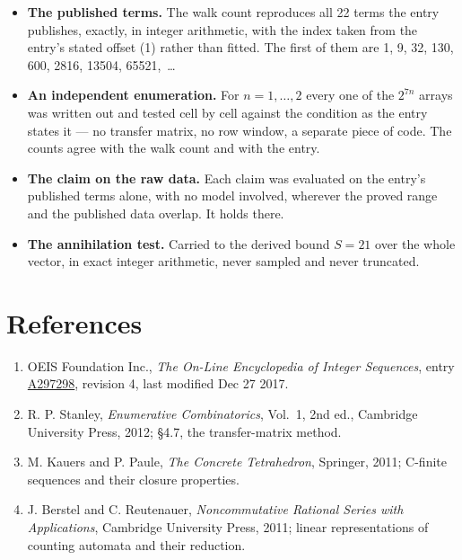 \documentclass[11pt]{article}
\theoremstyle{definition}
\begin{document}
\begin{itemize}

\item {\bfseries The published terms.} The walk count reproduces all 22 terms the entry publishes, exactly, in integer arithmetic, with the index taken from the entry's stated offset (1) rather than fitted. The first of them are 1, 9, 32, 130, 600, 2816, 13504, 65521,~\dots

\item {\bfseries An independent enumeration.} For $n = 1,\dots,2$ every one of the $2^{7n}$ arrays was written out and tested cell by cell against the condition as the entry states it --- no transfer matrix, no row window, a separate piece of code. The counts agree with the walk count and with the entry.

\item {\bfseries The claim on the raw data.} Each claim was evaluated on the entry's published terms alone, with no model involved, wherever the proved range and the published data overlap. It holds there.

\item {\bfseries The annihilation test.} Carried to the derived bound $S = 21$ over the whole vector, in exact integer arithmetic, never sampled and never truncated.

\end{itemize}

\section{References}

\begin{enumerate}

\item OEIS Foundation Inc., \emph{The On-Line Encyclopedia of Integer Sequences}, entry \href{https://oeis.org/A297298}{A297298}, revision 4, last modified Dec 27 2017.

\item R. P. Stanley, \emph{Enumerative Combinatorics}, Vol.~1, 2nd ed., Cambridge University Press, 2012; \S4.7, the transfer-matrix method.

\item M. Kauers and P. Paule, \emph{The Concrete Tetrahedron}, Springer, 2011; C-finite sequences and their closure properties.

\item J. Berstel and C. Reutenauer, \emph{Noncommutative Rational Series with Applications}, Cambridge University Press, 2011; linear representations of counting automata and their reduction.

\end{enumerate}
\end{document}
